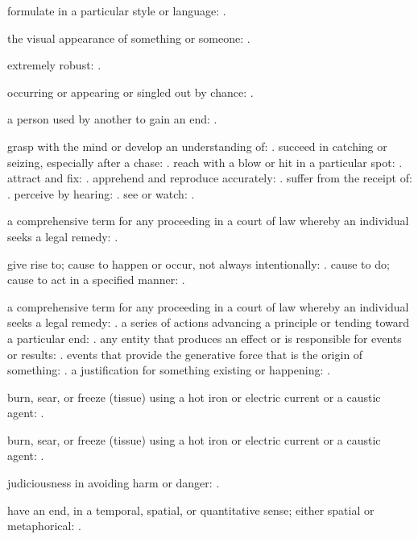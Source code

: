   formulate in a particular style or language: .

  the visual appearance of something or someone: .

  extremely robust: .

  occurring or appearing or singled out by chance: .

  a person used by another to gain an end: .

  grasp with the mind or develop an understanding of: . succeed in catching or seizing, especially after a chase: . reach with a blow or hit in a particular spot: . attract and fix: . apprehend and reproduce accurately: . suffer from the receipt of: . perceive by hearing: . see or watch: .

  a comprehensive term for any proceeding in a court of law whereby an individual seeks a legal remedy: .

  give rise to; cause to happen or occur, not always intentionally: . cause to do; cause to act in a specified manner: .

  a comprehensive term for any proceeding in a court of law whereby an individual seeks a legal remedy: . a series of actions advancing a principle or tending toward a particular end: . any entity that produces an effect or is responsible for events or results: . events that provide the generative force that is the origin of something: . a justification for something existing or happening: .

  burn, sear, or freeze (tissue) using a hot iron or electric current or a caustic agent: .

  burn, sear, or freeze (tissue) using a hot iron or electric current or a caustic agent: .

  judiciousness in avoiding harm or danger: .

  have an end, in a temporal, spatial, or quantitative sense; either spatial or metaphorical: .

